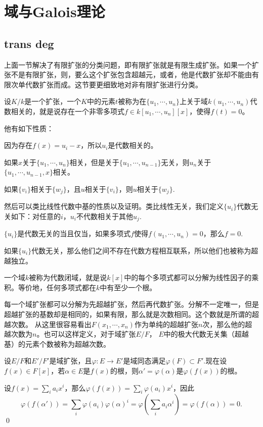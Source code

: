 \chapter{域与Galois理论}
\section{trans deg}
上面一节解决了有限扩张的分类问题，即有限扩张就是有限生成扩张。如果一个扩张不是有限扩张，则，要么这个扩张包含超越元，或者，他是代数扩张却不能由有限次单代数扩张而成。这节要更细致地对非有限扩张进行分类。


\para 设$K/k$是一个扩张，一个$K$中的元素$t$被称为在$\{u_1,\cdots ,u_n\}$上关于域$k(u_1,\cdots ,u_n)$代数相关的，就是说存在一个非零多项式$f\in k[u_1,\cdots ,u_n][x]$，使得$f(t)=0$。

他有如下性质：

 因为存在$f(x)=u_i-x$，所以$u_i$是代数相关的。

 如果$x$关于$\{u_1,\cdots ,u_n\}$相关，但是关于$\{u_1,\cdots ,u_{n-1}\}$无关，则$u_n$关于$\{u_1,\cdots ,u_{n-1},x\}$相关。

 如果$\{v_i\}$相关于$\{w_j\}$，且$u$相关于$\{v_i\}$，则$u$相关于$\{w_j\}$.

然后可以类比线性代数中基的性质以及证明。类比线性无关，我们定义$\{u_i\}$代数无关如下：对任意的$i$，$u_i$不代数相关于其他$u_j$.

\pro $\{u_i\}$是代数无关的当且仅当，如果多项式$f$使得$f(u_1,\cdots ,u_n)=0$，那么$f=0$.

如果$\{u_i\}$代数无关，那么他们之间不存在代数方程相互联系，所以他们也被称为超越独立。

\para 一个域$k$被称为代数闭域，就是说$k[x]$中的每个多项式都可以分解为线性因子的乘积。等价地，任何多项式都在$k$中有至少一个根。

每一个域扩张都可以分解为先超越扩张，然后再代数扩张。分解不一定唯一，但是超越扩张的基数却是相同的，如果有限，那么就是次数相同。这个数就是所谓的超越次数。 从这里很容易看出$F(x_1,\cdots ,x_n)$作为单纯的超越扩张$n$次，那么他的超越次数为$n$。也可以这样定义，对于域扩张$E/F$， $E$中的极大代数无关集（超越基）的元素个数被称为超越次数。

\lem 设$E/F$和$E'/F'$是域扩张，且$\varphi:E\to E'$是域同态满足$\varphi(F)\subset F'$.现在设$f(x)\in F[x]$，若$\alpha\in E$是$f(x)$的根，则$\alpha'=\varphi(\alpha)$是$\varphi(f(x))$的根。

\proof 设$f(x)=\sum_i a_i x^i$，那么$\varphi(f(x))=\sum_i \varphi(a_i) x^i$，因此
\[
	\varphi(f(\alpha'))=\sum_i \varphi(a_i) \varphi(\alpha)^i=\varphi\left(\sum_i a_i\alpha^i\right)=\varphi\left(f(\alpha)\right)=0.
\]\qed

